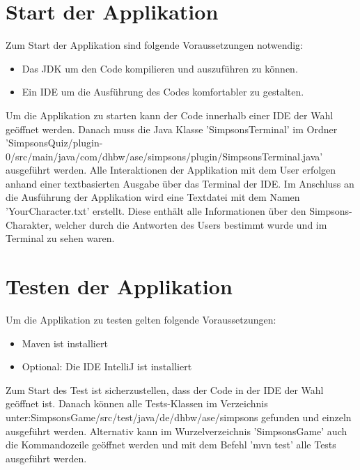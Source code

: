 \section{Start der Applikation}
Zum Start der Applikation sind folgende Voraussetzungen notwendig:
\begin{itemize}
    \item Das \ac{JDK} um den Code kompilieren und auszuführen zu können.
    \item Ein \ac{IDE} um die Ausführung des Codes komfortabler zu gestalten.
\end{itemize}
Um die Applikation zu starten kann der Code innerhalb einer \ac{IDE} der Wahl geöffnet werden. Danach muss die Java Klasse 'SimpsonsTerminal' im Ordner 'SimpsonsQuiz/plugin-0/src/main/java/com/dhbw/ase/simpsons/plugin/SimpsonsTerminal.java' ausgeführt werden. Alle Interaktionen der Applikation mit dem User erfolgen anhand einer textbasierten Ausgabe über das Terminal der \ac{IDE}. Im Anschluss an die Ausführung der Applikation wird eine Textdatei mit dem Namen 'YourCharacter.txt' erstellt. Diese enthält alle Informationen über den Simpsons-Charakter, welcher durch die Antworten des Users bestimmt wurde und im Terminal zu sehen waren. 

\section{Testen der Applikation}
Um die Applikation zu testen gelten folgende Voraussetzungen:
\begin{itemize}
    \item Maven ist installiert
    \item Optional: Die \ac{IDE} IntelliJ ist installiert
\end{itemize}
Zum Start des Test ist sicherzustellen, dass der Code in der \ac{IDE} der Wahl geöffnet ist. Danach können alle Tests-Klassen im Verzeichnis unter:\newline SimpsonsGame/src/test/java/de/dhbw/ase/simpsons gefunden und einzeln ausgeführt werden. \newline
Alternativ kann im Wurzelverzeichnis 'SimpsonsGame' auch die Kommandozeile geöffnet werden und mit dem Befehl 'mvn test' alle Tests ausgeführt werden. \newline
